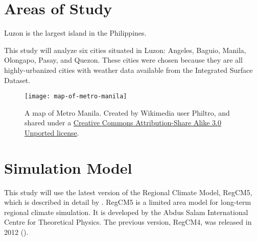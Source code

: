 \section{Areas of Study}
	Luzon is the largest island in the Philippines.
	
	This study will analyze six cities situated in Luzon:
		Angeles,
		Baguio,
		Manila,
		Olongapo,
		Pasay,
		and
		Quezon.
	These cities were chosen because they are all highly-urbanized cities with weather data available from the Integrated Surface Dataset.

	
	\begin{figure}
		\centering
		\texttt{[image: map-of-metro-manila]}
		\caption{
			A map of Metro Manila.
			Created by Wikimedia user Philtro, and shared under a
			\href{https://creativecommons.org/licenses/by-sa/3.0/deed.en}{Creative Commons Attribution-Share Alike 3.0 Unported license}.
		}
		\label{fig:map-of-metro-manila}
	\end{figure}	
		
\section{Simulation Model}
	This study will use the latest version of the Regional Climate Model, RegCM5, which is described in detail by \textcite{Giorgi2023}.
	RegCM5 is a limited area model for long-term regional climate simulation.
	It is developed by the Abdus Salam International Centre for Theoretical Physics.
	The previous version, RegCM4, was released in 2012 (\cite{Giorgi2012}).
	

